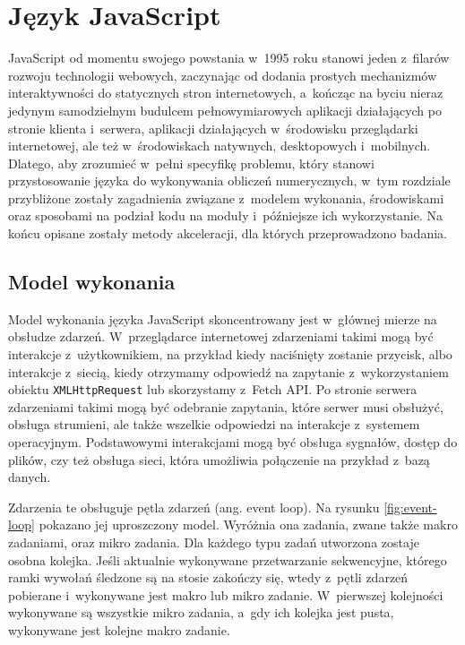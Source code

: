 \chapter{Język JavaScript}

JavaScript od momentu swojego powstania w~1995 roku stanowi jeden z~filarów rozwoju technologii webowych, zaczynając od dodania prostych mechanizmów interaktywności do statycznych stron internetowych, a~kończąc na byciu nieraz jedynym samodzielnym budulcem pełnowymiarowych aplikacji działających po stronie klienta i~serwera, aplikacji działających w~środowisku przeglądarki internetowej, ale też w~środowiskach natywnych, desktopowych i~mobilnych. Dlatego, aby zrozumieć w~pełni specyfikę problemu, który stanowi przystosowanie języka do wykonywania obliczeń numerycznych, w~tym rozdziale przybliżone zostały zagadnienia związane z~modelem wykonania, środowiskami oraz sposobami na podział kodu na moduły i~późniejsze ich wykorzystanie. Na końcu opisane zostały metody akceleracji, dla których przeprowadzono badania.



\section{Model wykonania}

Model wykonania języka JavaScript skoncentrowany jest w~głównej mierze na obsłudze zdarzeń. W~przeglądarce internetowej zdarzeniami takimi mogą być interakcje z~użytkownikiem, na przykład kiedy naciśnięty zostanie przycisk, albo interakcje z~siecią, kiedy otrzymamy odpowiedź na zapytanie z~wykorzystaniem obiektu \lstinline{XMLHttpRequest} lub skorzystamy z~Fetch API. Po stronie serwera zdarzeniami takimi mogą być odebranie zapytania, które serwer musi obsłużyć, obsługa strumieni, ale także wszelkie odpowiedzi na interakcje z~systemem operacyjnym. Podstawowymi interakcjami mogą być obsługa sygnałów, dostęp do plików, czy też obsługa sieci, która umożliwia połączenie na przykład z~bazą danych.

Zdarzenia te obsługuje pętla zdarzeń (ang. event loop). Na rysunku \ref{fig:event-loop} pokazano jej uproszczony model. Wyróżnia ona zadania, zwane także makro zadaniami, oraz mikro zadania. Dla każdego typu zadań utworzona zostaje osobna kolejka. Jeśli aktualnie wykonywane przetwarzanie sekwencyjne, którego ramki wywołań śledzone są na stosie zakończy się, wtedy z~pętli zdarzeń pobierane i~wykonywane jest makro lub mikro zadanie. W~pierwszej kolejności wykonywane są wszystkie mikro zadania, a~gdy ich kolejka jest pusta, wykonywane jest kolejne makro zadanie.

